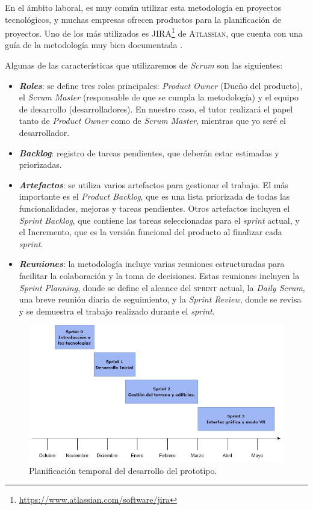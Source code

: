 \documentclass[a4paper, 11pt]{book}
\begin{document}
En el ámbito laboral, es muy común utilizar esta metodología en proyectos tecnológicos, y muchas empresas ofrecen productos para la planificación de proyectos. Uno de los más utilizados es \textsc{JIRA}\footnote{\url{https://www.atlassian.com/software/jira}} de \textsc{Atlassian}, que cuenta con una guía de la metodología muy bien documentada \cite{scrumGuide}.

\noindent Algunas de las características que utilizaremos de \emph{Scrum} son las siguientes:
\begin{itemize}
\item \textbf{\emph{Roles}}: se define tres roles principales: \emph{Product Owner} (Dueño del producto), el \emph{Scrum Master} (responsable de que se cumpla la metodología) y el equipo de desarrollo (desarrolladores). En nuestro caso, el tutor realizará el papel tanto de \emph{Product Owner} como de \emph{Scrum Master}, mientras que yo seré el desarrollador.
\item \textbf{\emph{Backlog}}: registro de tareas pendientes, que deberán estar estimadas y priorizadas.
\item \textbf{\emph{Artefactos}}: se utiliza varios artefactos para gestionar el trabajo. El más importante es el \emph{Product Backlog}, que es una lista priorizada de todas las funcionalidades, mejoras y tareas pendientes. Otros artefactos incluyen el \emph{Sprint} \emph{Backlog}, que contiene las tareas seleccionadas para el \emph{sprint} actual, y el Incremento, que es la versión funcional del producto al finalizar cada \emph{sprint}.
\item \textbf{\emph{Reuniones}}: la metodología incluye varias reuniones estructuradas para facilitar la colaboración y la toma de decisiones. Estas reuniones incluyen la \emph{Sprint Planning}, donde se define el alcance del \textsc{sprint} actual, la \emph{Daily Scrum}, una breve reunión diaria de seguimiento, y la \emph{Sprint Review}, donde se revisa y se demuestra el trabajo realizado durante el \emph{sprint}.
\end{itemize}

\begin{figure}[h]
  \centering
  \includegraphics[width=12cm, keepaspectratio]{img/scrum.jpg}
  \caption{Planificación temporal del desarrollo del prototipo.}
  \label{fig:scrum}
\end{figure}
\end{document}

